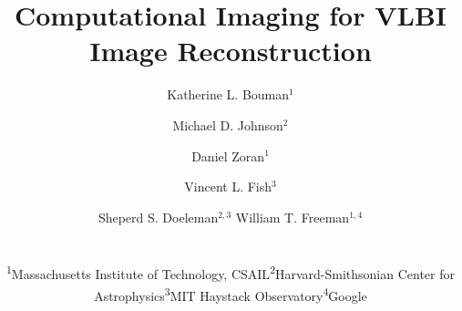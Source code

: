 \documentclass[10pt,twocolumn,letterpaper]{article}
\begin{document}
\title{Computational Imaging for VLBI Image Reconstruction \\ \vspace{0in} }


\author{Katherine L. Bouman$^{1}$
	\and
	Michael D. Johnson$^{2}$
	\and
	Daniel Zoran$^{1}$
	\and
	Vincent L. Fish$^{3}$
	\and
	Sheperd S. Doeleman$^{2,3}$ \hspace{0.4in}
	William T. Freeman$^{1,4}$
	\\ \\
	\small{ \hspace{-0.3in}
		\begin{tabular}{cccc}
			\textsuperscript{1}Massachusetts Institute of Technology, CSAIL  & \textsuperscript{2}Harvard-Smithsonian Center for Astrophysics &
			\textsuperscript{3}MIT Haystack Observatory &
			\textsuperscript{4}Google \\
		\end{tabular}
	}
}
\end{document}
